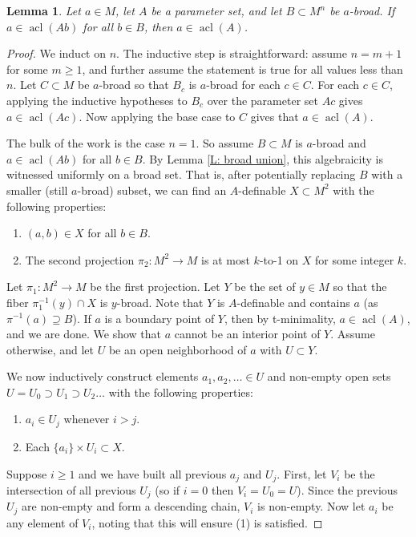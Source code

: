 \documentclass{amsart}
\newtheorem{lemma}[theorem]{Lemma}
\theoremstyle{definition}
\newcommand{\acl}{\operatorname{acl}}
\begin{document}
\begin{lemma}\label{L: broad algebraic}
    Let $a\in M$, let $A$ be a parameter set, and let $B\subset M^n$ be $a$-broad. If $a\in\acl(Ab)$ for all $b\in B$, then $a\in\acl(A)$.
\end{lemma}
\begin{proof}
    We induct on $n$. The inductive step is straightforward: assume $n=m+1$ for some $m\geq 1$, and further assume the statement is true for all values less than $n$. Let $C\subset M$ be $a$-broad so that $B_c$ is $a$-broad for each $c\in C$. For each $c\in C$, applying the inductive hypotheses to $B_c$ over the parameter set $Ac$ gives  $a\in\acl(Ac)$. Now applying the base case to $C$ gives that $a\in\acl(A)$.

    The bulk of the work is the case $n=1$. So assume $B\subset M$ is $a$-broad and $a\in\acl(Ab)$ for all $b\in B$. By Lemma \ref{L: broad union}, this algebraicity is witnessed uniformly on a broad set. That is, after potentially replacing  $B$ with a smaller (still $a$-broad) subset, we can find an $A$-definable $X\subset M^2$ with the following properties:
    \begin{enumerate}
        \item $(a,b)\in X$ for all $b\in B$.
        \item The second projection $\pi_2:M^2\rightarrow M$ is at most $k$-to-1 on $X$ for some integer $k$.
    \end{enumerate}

    Let $\pi_1:M^2\rightarrow M$ be the first projection. Let $Y$ be the set of $y\in M$ so that the fiber $\pi_1^{-1}(y)\cap X$ is $y$-broad. Note that $Y$ is $A$-definable and contains $a$ (as $\pi^{-1}(a)\supseteq B$). If $a$ is a boundary point of $Y$, then by t-minimality, $a\in\acl(A)$, and we are done. We show that $a$ cannot be an interior point of $Y$. Assume otherwise, and let $U$ be an open neighborhood of $a$ with $U\subset Y$.

    We now inductively construct elements $a_1,a_2,\dots\in U$ and non-empty open sets $U=U_0\supset U_1\supset U_2\dots$ with the following properties:

    \begin{enumerate}
    \item $a_i\in U_j$ whenever $i>j$.
    \item Each $\{a_i\}\times U_i\subset X$.
    \end{enumerate}

    Suppose $i\geq 1$ and we have built all previous $a_j$ and $U_j$. First, let $V_i$ be the intersection of all previous $U_j$ (so if $i=0$ then $V_i=U_0=U$). Since the previous $U_j$ are non-empty and form a descending chain, $V_i$ is non-empty. Now let $a_i$ be any element of $V_i$, noting that this will ensure (1) is satisfied. 


\end{proof}
\end{document}
